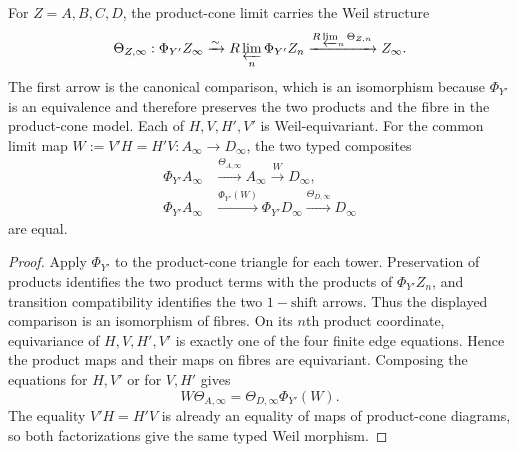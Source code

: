 \begin{lemma}
\label{lemma:weil-pbc-frobenius-product-cone-limit}
For $Z=A,B,C,D$, the product-cone limit carries the Weil structure
\[
 \Theta_{Z,\infty}:
 \Phi_{Y'}Z_\infty
 \xrightarrow{\sim}R\varprojlim_n\Phi_{Y'}Z_n
 \xrightarrow{R\varprojlim_n\Theta_{Z,n}}Z_\infty.
\]
The first arrow is the canonical comparison, which is an isomorphism because
$\Phi_{Y'}$ is an equivalence and therefore preserves the two products and
the fibre in the product-cone model.  Each of $H,V,H',V'$ is Weil-equivariant.
For the common limit map $W:=V'H=H'V:A_\infty\to D_\infty$, the two typed
composites
\[
\begin{aligned}
 \Phi_{Y'}A_\infty&\xrightarrow{\Theta_{A,\infty}}A_\infty
 \xrightarrow{W}D_\infty,\\
 \Phi_{Y'}A_\infty&\xrightarrow{\Phi_{Y'}(W)}\Phi_{Y'}D_\infty
 \xrightarrow{\Theta_{D,\infty}}D_\infty
\end{aligned}
\]
are equal.
\end{lemma}
\begin{proof}

Apply $\Phi_{Y'}$ to the product-cone triangle for each tower.  Preservation
of products identifies the two product terms with the products of
$\Phi_{Y'}Z_n$, and transition compatibility identifies the two
$1-\mathrm{shift}$ arrows.  Thus the displayed comparison is an isomorphism
of fibres.  On its $n$th product coordinate, equivariance of $H,V,H',V'$ is
exactly one of the four finite edge equations.  Hence the product maps and
their maps on fibres are equivariant.  Composing the equations for $H,V'$ or
for $V,H'$ gives
\[
 W\Theta_{A,\infty}
 =\Theta_{D,\infty}\Phi_{Y'}(W).
\]
The equality $V'H=H'V$ is already an equality of maps of product-cone
diagrams, so both factorizations give the same typed Weil morphism.
\end{proof}

